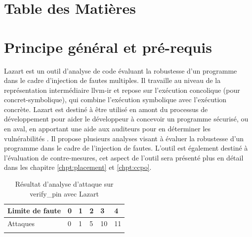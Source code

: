     \setcounter{tocdepth}{2}
    \section*{Table des Matières}
    \localtableofcontents
    
    \section{Principe général et pré-requis}
    \label{sec:lazart-overview}
        
        Lazart est un outil d'analyse de code évaluant la robustesse d'un programme dans le cadre d'injection de fautes multiples. Il travaille au niveau de la représentation intermédiaire \gls{llvm-ir} et repose sur l'exécution concolique \cite{Baldoni/CSUR18} (pour concret-symbolique), qui combine l'exécution symbolique avec l'exécution concrète. 
        Lazart est destiné à être utilisé en amont du processus de développement pour aider le développeur à concevoir un programme sécurisé, ou en aval, en apportant une aide aux auditeurs pour en déterminer les vulnérabilités \cite{inter_cesti}. Il propose plusieurs analyses visant à évaluer la robustesse d'un programme dans le cadre de l'injection de fautes.
        L'outil est également destiné à l'évaluation de contre-mesures, cet aspect de l'outil sera présenté plus en détail dans les chapitre \ref{chpt:placement} et \ref{chpt:ccpo}.
        
        \begin{table}[h]
            \begin{center}
                \begin{tabular}{|l|l|l|l|l|l|}
                \hline
                \rowcolor[HTML]{C0C0C0} 
                Limite de faute                           & 0                         & 1                         & 2                         & 3                          & 4                          \\ \hline
                \cellcolor[HTML]{C0C0C0}Attaques       & \cellcolor[HTML]{9AFF99}0 & \cellcolor[HTML]{FFCCC9}1 & \cellcolor[HTML]{FFCCC9}5 & \cellcolor[HTML]{FFCCC9}10 & \cellcolor[HTML]{FFCCC9}11 \\ \hline
                \rowcolor[HTML]{FFCCC9} 
                \end{tabular}
                \caption{Résultat d'analyse d'attaque sur verify\_pin avec Lazart \label{tbl:vp-results}}
            \end{center}
        \end{table}
        
